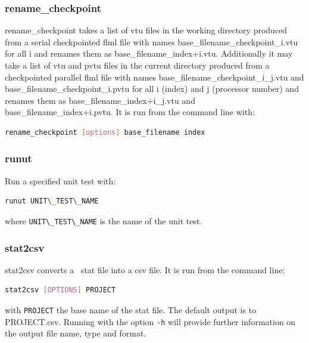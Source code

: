 
\subsubsection{rename\_checkpoint}
\label{sec:rename_checkpoint}
rename\_checkpoint takes a list of vtu files in the working directory produced from a serial checkpointed flml file with names base\_filename\_checkpoint\_i.vtu for all i and renames them as base\_filename\_index+i.vtu. Additionally it may take a list of
vtu and pvtu files in the current directory produced from a checkpointed parallel flml file with names base\_filename\_checkpoint\_i\_j.vtu and base\_filename\_checkpoint\_i.pvtu for all i (index) and j (processor number) and renames them as base\_filename\_index+i\_j.vtu and base\_filename\_index+i.pvtu. It is run from the command line with:
\begin{lstlisting}[language = Bash]
rename_checkpoint [options] base_filename index
\end{lstlisting}


\subsubsection{runut}
\label{sec:runut}
Run a specified unit test with:
\begin{lstlisting}[language = Bash]
runut UNIT\_TEST\_NAME
\end{lstlisting}
where \lstinline[language = Bash]+UNIT\_TEST\_NAME+ is the name of the unit test.


\subsubsection{stat2csv}
\label{sec:stat2csv}
stat2csv converts a \fluidity\ stat file into a csv file. It is run from the command line:
\begin{lstlisting}[language = Bash]
stat2csv [OPTIONS] PROJECT
\end{lstlisting}
with \lstinline[language = Bash]+PROJECT+ the base name of the stat file. The default output is to PROJECT.csv. Running with the option \lstinline[language = Bash]+-h+ will provide further information on the output file name, type and format.

